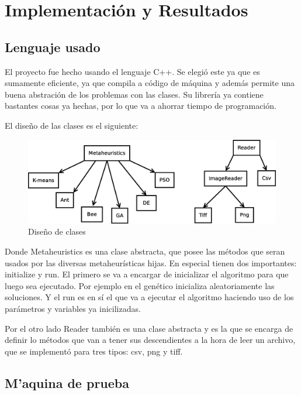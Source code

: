 \chapter{Implementaci\'on y Resultados} \label{chap:impresultados}

\vspace{5 mm}

\section{Lenguaje usado}

El proyecto fue hecho usando el lenguaje C++. Se elegi\'o este ya que es sumamente
eficiente, ya que compila a c\'odigo de m\'aquina y adem\'as permite una buena
abstraci\'on de los problemas con las clases. Su librer\'ia ya contiene bastantes
cosas ya hechas, por lo que va a ahorrar tiempo de programaci\'on.

El dise\~no de las clases es el siguiente:

\begin{figure}[htb]
\centering
\includegraphics[scale=0.35]{figures/clases.eps}
\caption{Dise\~no de clases}
\label{fig:jclases}
\end{figure}

Donde Metaheuristics es una clase abstracta, que posee las m\'etodos que seran
usados por las diversas metaheur\'isticas hijas. En especial tienen dos 
importantes: initialize y run. El primero se va a encargar de inicializar el algoritmo
para que luego sea ejecutado. Por ejemplo en el gen\'etico inicializa aleatoriamente
las soluciones. Y el run es en s\'i el que va a ejecutar el algoritmo haciendo 
uso de los par\'ametros y variables ya inicilizadas.

Por el otro lado Reader tambi\'en
es una clase abstracta y es la que se encarga de definir lo m\'etodos que van a 
tener sus descendientes a la hora de leer un archivo, que se implement\'o para 
tres tipos: csv, png y tiff.

\section{M'aquina de prueba} \label{sect:testbed}

